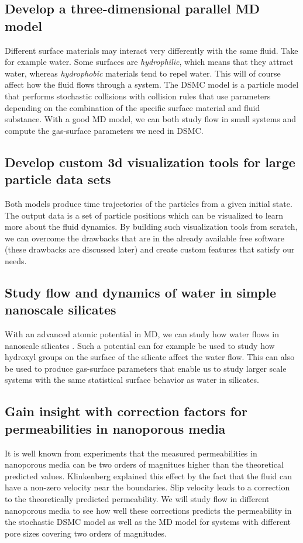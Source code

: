\subsection{Develop a three-dimensional parallel MD model}
\label{goal:md_1}
Different surface materials may interact very differently with the same fluid. Take for example water. Some surfaces are \textit{hydrophilic}, which means that they attract water, whereas \textit{hydrophobic} materials tend to repel water. This will of course affect how the fluid flows through a system. The DSMC model is a particle model that performs stochastic collisions with collision rules that use parameters depending on the combination of the specific surface material and fluid substance. With a good MD model, we can both study flow in small systems and compute the gas-surface parameters we need in DSMC. 
\subsection{Develop custom 3d visualization tools for large particle data sets}
\label{goal:vis}
Both models produce time trajectories of the particles from a given initial state. The output data is a set of particle positions which can be visualized to learn more about the fluid dynamics. By building such visualization tools from scratch, we can overcome the drawbacks that are in the already available free software (these drawbacks are discussed later) and create custom features that satisfy our needs. 

\subsection{Study flow and dynamics of water in simple nanoscale silicates}
\label{goal:md_2}
With an advanced atomic potential in MD, we can study how water flows in nanoscale silicates \cite{vashishta1990interaction}. Such a potential can for example be used to study how hydroxyl groups on the surface of the silicate affect the water flow. This can also be used to produce gas-surface parameters that enable us to study larger scale systems with the same statistical surface behavior as water in silicates. 

\subsection{Gain insight with correction factors for permeabilities in nanoporous media}
\label{goal:knudsen}
It is well known from experiments that the measured permeabilities in nanoporous media can be two orders of magnitues higher than the theoretical predicted values. Klinkenberg explained this effect by the fact that the fluid can have a non-zero velocity near the boundaries\cite{klinkenberg1941permeability}. Slip velocity leads to a correction to the theoretically predicted permeability. We will study flow in different nanoporous media to see how well these corrections predicts the permeability in the stochastic DSMC model as well as the MD model for systems with different pore sizes covering two orders of magnitudes. 
\renewcommand{\thesubsection}{\thesection.\arabic{subsection}}

